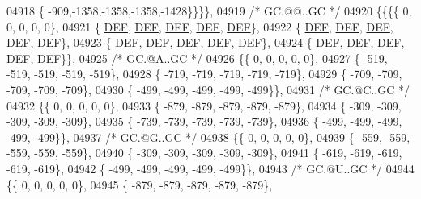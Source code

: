 \begin{DoxyCode}
04918 \{ -909,-1358,-1358,-1358,-1428\}\}\}\},
04919 \textcolor{comment}{/* GC.@@..GC */}
04920 \{\{\{\{    0,    0,    0,    0,    0\},
04921 \{  \mbox{\hyperlink{1_88_84__epars_8h_a397419fc12b37ed479c8abb9d444d843}{DEF}},  \mbox{\hyperlink{1_88_84__epars_8h_a397419fc12b37ed479c8abb9d444d843}{DEF}},  \mbox{\hyperlink{1_88_84__epars_8h_a397419fc12b37ed479c8abb9d444d843}{DEF}},  \mbox{\hyperlink{1_88_84__epars_8h_a397419fc12b37ed479c8abb9d444d843}{DEF}},  \mbox{\hyperlink{1_88_84__epars_8h_a397419fc12b37ed479c8abb9d444d843}{DEF}}\},
04922 \{  \mbox{\hyperlink{1_88_84__epars_8h_a397419fc12b37ed479c8abb9d444d843}{DEF}},  \mbox{\hyperlink{1_88_84__epars_8h_a397419fc12b37ed479c8abb9d444d843}{DEF}},  \mbox{\hyperlink{1_88_84__epars_8h_a397419fc12b37ed479c8abb9d444d843}{DEF}},  \mbox{\hyperlink{1_88_84__epars_8h_a397419fc12b37ed479c8abb9d444d843}{DEF}},  \mbox{\hyperlink{1_88_84__epars_8h_a397419fc12b37ed479c8abb9d444d843}{DEF}}\},
04923 \{  \mbox{\hyperlink{1_88_84__epars_8h_a397419fc12b37ed479c8abb9d444d843}{DEF}},  \mbox{\hyperlink{1_88_84__epars_8h_a397419fc12b37ed479c8abb9d444d843}{DEF}},  \mbox{\hyperlink{1_88_84__epars_8h_a397419fc12b37ed479c8abb9d444d843}{DEF}},  \mbox{\hyperlink{1_88_84__epars_8h_a397419fc12b37ed479c8abb9d444d843}{DEF}},  \mbox{\hyperlink{1_88_84__epars_8h_a397419fc12b37ed479c8abb9d444d843}{DEF}}\},
04924 \{  \mbox{\hyperlink{1_88_84__epars_8h_a397419fc12b37ed479c8abb9d444d843}{DEF}},  \mbox{\hyperlink{1_88_84__epars_8h_a397419fc12b37ed479c8abb9d444d843}{DEF}},  \mbox{\hyperlink{1_88_84__epars_8h_a397419fc12b37ed479c8abb9d444d843}{DEF}},  \mbox{\hyperlink{1_88_84__epars_8h_a397419fc12b37ed479c8abb9d444d843}{DEF}},  \mbox{\hyperlink{1_88_84__epars_8h_a397419fc12b37ed479c8abb9d444d843}{DEF}}\}\},
04925 \textcolor{comment}{/* GC.@A..GC */}
04926 \{\{    0,    0,    0,    0,    0\},
04927 \{ -519, -519, -519, -519, -519\},
04928 \{ -719, -719, -719, -719, -719\},
04929 \{ -709, -709, -709, -709, -709\},
04930 \{ -499, -499, -499, -499, -499\}\},
04931 \textcolor{comment}{/* GC.@C..GC */}
04932 \{\{    0,    0,    0,    0,    0\},
04933 \{ -879, -879, -879, -879, -879\},
04934 \{ -309, -309, -309, -309, -309\},
04935 \{ -739, -739, -739, -739, -739\},
04936 \{ -499, -499, -499, -499, -499\}\},
04937 \textcolor{comment}{/* GC.@G..GC */}
04938 \{\{    0,    0,    0,    0,    0\},
04939 \{ -559, -559, -559, -559, -559\},
04940 \{ -309, -309, -309, -309, -309\},
04941 \{ -619, -619, -619, -619, -619\},
04942 \{ -499, -499, -499, -499, -499\}\},
04943 \textcolor{comment}{/* GC.@U..GC */}
04944 \{\{    0,    0,    0,    0,    0\},
04945 \{ -879, -879, -879, -879, -879\},

\end{DoxyCode}
